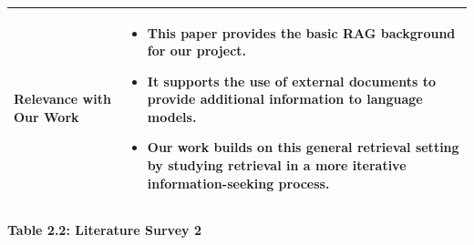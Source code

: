 \documentclass[12pt,a4paper]{report}
\begin{document}
\begin{longtable}{|p{1.25in}|p{5.15in}|}
\textbf{Relevance with Our Work} &
\begin{itemize}[leftmargin=0.18in,itemsep=0.05in,topsep=0pt,parsep=0pt]
\item This paper provides the basic RAG background for our project.
\item It supports the use of external documents to provide additional information to language models.
\item Our work builds on this general retrieval setting by studying retrieval in a more iterative information-seeking process.
\end{itemize} \\ \hline
\end{longtable}
\clearpage


\begin{center}\textbf{Table 2.2: Literature Survey 2}\end{center}\label{tab:lit2}
\end{document}
